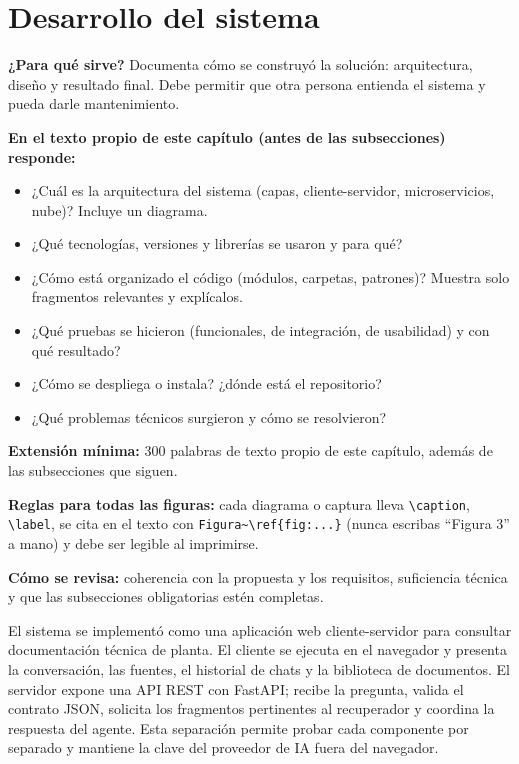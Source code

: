 
\section{Desarrollo del sistema} \label{sec:desarrollo_sistema} %

\begin{guia}
\textbf{¿Para qué sirve?} Documenta cómo se construyó la solución: arquitectura, diseño y resultado final. Debe permitir
que otra persona entienda el sistema y pueda darle mantenimiento.

\textbf{En el texto propio de este capítulo (antes de las subsecciones) responde:}
\begin{itemize}[nosep,leftmargin=*]
  \item ¿Cuál es la arquitectura del sistema (capas, cliente-servidor, microservicios, nube)? Incluye un diagrama.
  \item ¿Qué tecnologías, versiones y librerías se usaron y para qué?
  \item ¿Cómo está organizado el código (módulos, carpetas, patrones)? Muestra solo fragmentos relevantes y explícalos.
  \item ¿Qué pruebas se hicieron (funcionales, de integración, de usabilidad) y con qué resultado?
  \item ¿Cómo se despliega o instala? ¿dónde está el repositorio?
  \item ¿Qué problemas técnicos surgieron y cómo se resolvieron?
\end{itemize}

\textbf{Extensión mínima:} 300 palabras de texto propio de este capítulo, además de las subsecciones que siguen.

\textbf{Reglas para todas las figuras:} cada diagrama o captura lleva \verb|\caption|, \verb|\label|, se cita en el texto con
\verb|Figura~\ref{fig:...}| (nunca escribas ``Figura 3'' a mano) y debe ser legible al imprimirse.

\textbf{Cómo se revisa:} coherencia con la propuesta y los requisitos, suficiencia técnica y que las subsecciones
obligatorias estén completas.
\end{guia}

El sistema se implementó como una aplicación web cliente-servidor para consultar documentación técnica de planta. El
cliente se ejecuta en el navegador y presenta la conversación, las fuentes, el historial de chats y la biblioteca de
documentos. El servidor expone una API REST con FastAPI; recibe la pregunta, valida el contrato JSON, solicita los
fragmentos pertinentes al recuperador y coordina la respuesta del agente. Esta separación permite probar cada componente
por separado y mantiene la clave del proveedor de IA fuera del navegador.

